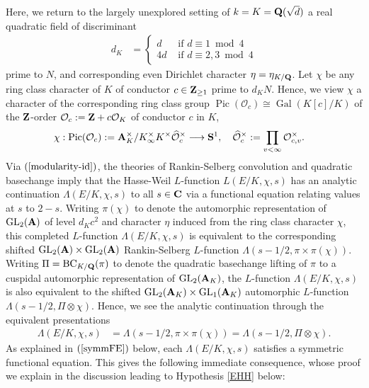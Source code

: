 \documentclass{amsart}
\theoremstyle{definition}
\begin{document}
Here, we return to the largely unexplored setting of $k  = K = {\bf{Q}}(\sqrt{d})$ a real quadratic field of discriminant 
\begin{align*} d_K  &= \begin{cases} d &\text{ if $d \equiv 1 \bmod 4$} \\ 4 d &\text{ if $d \equiv 2, 3 \bmod 4$} \end{cases} \end{align*} 
prime to $N$, and corresponding even Dirichlet character $\eta = \eta_{K/{\bf{Q}}}$. 
Let $\chi$ be any ring class character of $K$ of conductor $c \in {\bf{Z}}_{\geq 1}$ prime to $d_K N$. 
Hence, we view $\chi$ a character of the corresponding ring class group $\operatorname{Pic}(\mathcal{O}_c) \cong \operatorname{Gal}(K[c]/K)$ 
of the ${\bf{Z}}$-order $\mathcal{O}_c := {\bf{Z}} + c \mathcal{O}_K$ of conductor $c$ in $K$, 
\begin{align*} \chi: \operatorname{Pic}(\mathcal{O}_c) 
:= {\bf{A}}_K^{\times} / K_{\infty}^{\times} K^{\times} \widehat{\mathcal{O}}_c^{\times} &\longrightarrow {\bf{S}}^1,
\quad \widehat{\mathcal{O}}_c^{\times} := \prod_{v < \infty} \mathcal{O}_{c, v}^{\times}. \end{align*}
Via $(\ref{modularity-id})$, the theories of Rankin-Selberg convolution and quadratic basechange imply that the Hasse-Weil $L$-function
$L(E/K, \chi, s)$ has an analytic continuation $\Lambda(E/K, \chi, s)$ to all $s \in {\bf{C}}$ via a functional equation relating values at $s$ to $2-s$.
Writing $\pi(\chi)$ to denote the automorphic representation of $\operatorname{GL}_2({\bf{A}})$ of level $d_K c^2$ and character $\eta$ 
induced from the ring class character $\chi$, this completed $L$-function $\Lambda(E/K, \chi, s)$ is 
equivalent to the corresponding shifted $\operatorname{GL}_2({\bf{A}}) \times \operatorname{GL}_2({\bf{A}})$ Rankin-Selberg $L$-function 
$\Lambda(s-1/2, \pi \times \pi(\chi))$. Writing $\Pi = \operatorname{BC}_{K/{\bf{Q}}}(\pi)$ to denote the quadratic basechange lifting of $\pi$ to a 
cuspidal automorphic representation of $\operatorname{GL}_2({\bf{A}}_K)$, the $L$-function $\Lambda(E/K, \chi, s)$ is also equivalent
to the shifted $\operatorname{GL}_2({\bf{A}}_K) \times \operatorname{GL}_1({\bf{A}}_K)$ automorphic $L$-function $\Lambda(s-1/2, \Pi \otimes \chi)$.  
Hence, we see the analytic continuation through the equivalent presentations 
\begin{align*} \Lambda(E/K, \chi, s) &= \Lambda(s-1/2, \pi \times \pi(\chi)) = \Lambda(s-1/2, \Pi \otimes \chi). \end{align*}
As explained in $(\ref{symmFE})$ below, each $\Lambda(E/K, \chi, s)$ satisfies a symmetric functional equation.
This gives the following immediate consequence, whose proof we explain in the discussion leading to Hypothesis \ref{EHH} below:
\end{document}
